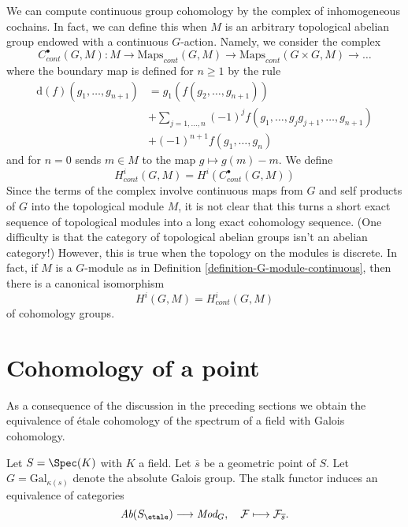 \noindent
We can compute continuous group cohomology by the complex of
inhomogeneous cochains. In fact, we can define this when $M$ is an
arbitrary topological abelian group endowed with a continuous $G$-action.
Namely, we consider the complex
$$
C^\bullet_{cont}(G, M) :
M \to \text{Maps}_{cont}(G, M) \to
\text{Maps}_{cont}(G \times G, M) \to \ldots
$$
where the boundary map is defined for $n \geq 1$ by the rule
\begin{align*}
\text{d}(f)(g_1, \ldots, g_{n + 1})
& = g_1(f(g_2, \ldots, g_{n + 1})) \\
&
+ \sum\nolimits_{j = 1, \ldots, n}
(-1)^jf(g_1, \ldots, g_jg_{j + 1}, \ldots, g_{n + 1}) \\
&
+ (-1)^{n + 1}f(g_1, \ldots, g_n)
\end{align*}
and for $n = 0$ sends $m \in M$ to the map $g \mapsto g(m) - m$. We define
$$
H^i_{cont}(G, M) = H^i(C^\bullet_{cont}(G, M))
$$
Since the terms of the complex involve continuous maps from $G$ and
self products of $G$ into the topological module $M$, it is not clear
that this turns a short exact sequence of topological modules into
a long exact cohomology sequence. (One difficulty is that the category
of topological abelian groups isn't an abelian category!) However, this
is true when the topology on the modules is discrete. In fact, if $M$
is a $G$-module as in Definition \ref{definition-G-module-continuous},
then there is a canonical isomorphism
$$
H^i(G, M) = H^i_{cont}(G, M)
$$
of cohomology groups.






\section{Cohomology of a point}
\label{section-cohomology-point}

\noindent
As a consequence of the discussion in the preceding sections
we obtain the equivalence of \'etale cohomology of the spectrum of a
field with Galois cohomology.

\begin{lemma}
\label{lemma-equivalence-abelian-sheaves-point}
Let $S = \Spec(K)$ with $K$ a field.
Let $\overline{s}$ be a geometric point of $S$.
Let $G = \text{Gal}_{\kappa(s)}$ denote the absolute Galois group.
The stalk functor induces an equivalence of categories
$$
\textit{Ab}(S_\etale) \longrightarrow \textit{Mod}_G,
\quad
\mathcal{F} \longmapsto \mathcal{F}_{\overline{s}}.
$$
\end{lemma}

